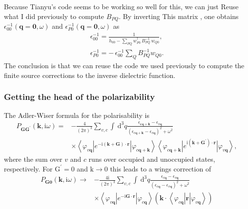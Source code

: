  Because Tianyu's code seems to be working so well for this, we can just Reuse what I did previously to compute  $B_{PQ}$.
By inverting This matrix , one obtains
$\epsilon_{00}^{-1}(\mathbf{q}=\mathbf{0}, \omega)$
and $\epsilon_{P0}^{-1}(\mathbf{q}=\mathbf{0}, \omega)$ as
\begin{gather}
\epsilon_{00}^{-1}
  = \frac{1}{h_{00}
            - \displaystyle\sum_{PQ}
              w_{P0}^{\dagger}\,B_{PQ}^{-1}\,w_{Q0}},
  \tag{53} \\
\epsilon_{P0}^{-1}
  = -\,\epsilon_{00}^{-1}
      \sum_Q B_{PQ}^{-1} w_{Q0}.
  \tag{54}
\end{gather}
The conclusion is that we can reuse the code we used previously to compute the finite source corrections to the inverse dielectric function. 
\subsubsection{Getting the head of the polarizability}
The Adler-Wiser formula for the polarisability is
\begin{align}
    P_{\mathbf{G G}^{\prime}}(\mathbf{k}, \mathrm{i} \omega)= & -\frac{4}{(2 \pi)^3} \sum_{v, c} \int \mathrm{~d}^3 q \frac{\epsilon_{\mathbf{c q}+\mathbf{k}}-\epsilon_{v \mathbf{q}}}{\left(\epsilon_{c \mathbf{q}+\mathbf{k}}-\epsilon_{v \mathbf{q}}\right)^2+\omega^2} \\
& \times\left\langle\varphi_{v \mathbf{q}}\right| e^{-\mathrm{i}(\mathbf{k}+\mathbf{G}) \cdot \mathbf{r}}\left|\varphi_{c \mathbf{q}+\mathbf{k}}\right\rangle\left\langle\varphi_{c \mathbf{q}+\mathbf{k}}\right| e^{\mathrm{i}\left(\mathbf{k}+\mathbf{G}^{\prime}\right) \cdot \mathbf{r}}\left|\varphi_{v \mathbf{q}}\right\rangle,
\end{align}
where the sum over $v$ and $c$ runs over occupied and unoccupied states, respectively. For $\mathrm{G}^{\prime}=0$ and $\mathrm{k} \rightarrow 0$ this leads to a wings correction of
\begin{align}
    P_{\mathbf{G} \mathbf{0}}(\mathbf{k}, \mathrm{i} \omega) \rightarrow & -\frac{4 \mathrm{i}}{(2 \pi)^3} \sum_{v, c} \int \mathrm{~d}^3 q \frac{\epsilon_{c \mathbf{q}}-\epsilon_{v \mathbf{q}}}{\left(\epsilon_{c \mathbf{q}}-\epsilon_{v \mathbf{q}}\right)^2+\omega^2}  \\
& \times\left\langle\varphi_{v \mathbf{q}}\right| e^{-\mathrm{i} \mathbf{G} \cdot \mathbf{r}}\left|\varphi_{c \mathbf{q}}\right\rangle\left(\mathbf{k} \cdot\left\langle\varphi_{c \mathbf{q}}\right| \mathbf{r}\left|\varphi_{v \mathbf{q}}\right\rangle\right)
\end{align}
